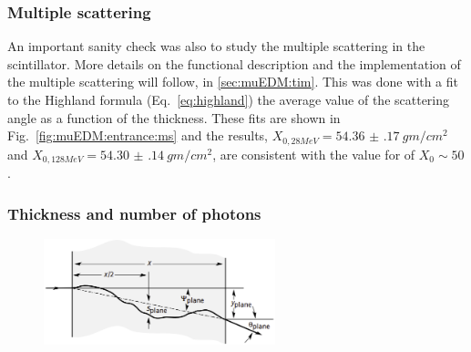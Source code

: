 \begin{refsection}
        \subsubsection{Multiple scattering}
            An important sanity check was also to study the multiple scattering in the scintillator. 
            More details on the functional description and the \gf implementation of the multiple scattering will follow, in \ref{sec:muEDM:tim}.
            This was done with a fit to the Highland formula (Eq.~\ref{eq:highland}) the average value of the scattering angle as a function of the thickness. 
            These fits are shown in Fig.~\ref{fig:muEDM:entrance:ms} and the results, $X_{0, 28MeV} = \SI{54.36(17)}{gm/cm^2}$ and $X_{0, 128MeV} = \SI{54.30(14)}{gm/cm^2}$, are consistent with the value for  of $X_{0}\sim 50$.

        \subsubsection{Thickness and number of photons}
            
        \begin{figure}
            \centering
            \includegraphics[width=0.6\textwidth]{Figures/muEDM/Entrance/multiple-scattering_pdg.png}\\
            \caption{}
            \label{fig:muEDM:entrance:pdgms}
        \end{figure}


\end{refsection}
